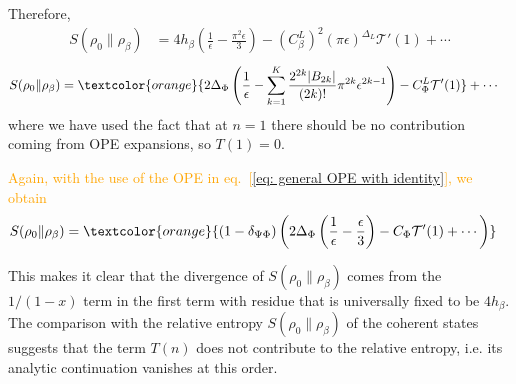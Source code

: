 \documentclass[11pt]{article}
\newcommand{\ep}{\epsilon}
\newcommand{\lb}{\left(}
\newcommand{\rb}{\right)}
\newcommand{\JM}[1]{\textcolor{orange}{#1}}
\begin{document}
Therefore,
\begin{align}
  S(\rho_0\|\rho_\beta)&=4h_\beta\lb\frac{1}{\ep}-\frac{\pi^2\ep}{3}\rb - {(C_\beta^L)}^2 (\pi \ep)^{\Delta_L} \mathcal{T}'(1)+\cdots
\end{align}
\begin{align*}
  S(\rho_0\|\rho_\beta)&=\JM{2\Delta_{\Phi}\lb\frac{1}{\ep}
  - \sum_{k=1}^{K} \frac{2^{2k}|B_{2k}|} {(2k)!}\pi^{2k}\ep^{2k-1}
  \rb - C_\Phi^L  \mathcal{T}'(1)}+\cdots
\end{align*}
where we have used the fact that at $n=1$ there should be no contribution coming from OPE expansions, so $T(1)=0$.

\JM{Again, with the use of the OPE in eq.~[\ref{eq: general OPE with identity}], we obtain}
\begin{align}
 S(\rho_0\|\rho_\beta)&=\JM{(1-\delta_{\Psi \Phi})\lb 2\Delta_{\Phi}\lb\frac{1}{\ep}
  - \frac{\ep}{3}
  \rb - C_\Phi  \mathcal{T}'(1)+\cdots\rb}
\end{align}

This makes it clear that the divergence of $S(\rho_0\|\rho_\beta)$ comes from the $1/(1-x)$ term in the first term with residue that is universally fixed to be $4h_\beta$. The comparison with the relative entropy $S(\rho_0\|\rho_\beta)$ of the coherent states suggests that the term $T(n)$ does not contribute to the relative entropy, i.e. its analytic continuation vanishes at this order.
\end{document}
